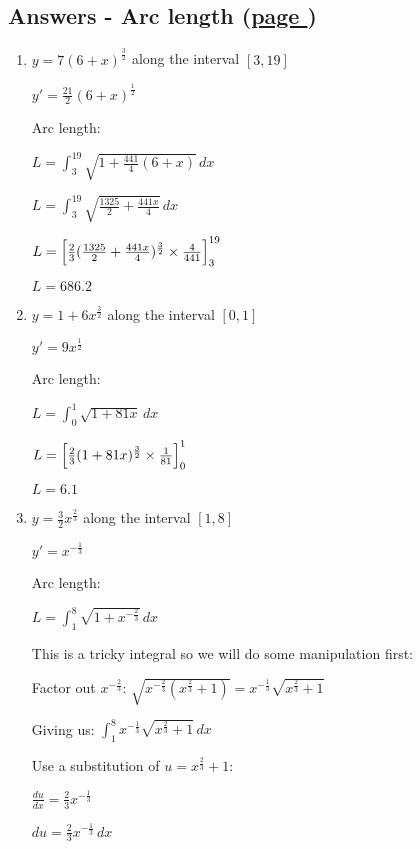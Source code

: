 \documentclass[../main.tex]{subfiles}
\begin{document}
\hypertarget{arclengthanswers}{\subsection*{Answers - Arc length (\hyperlink{arclengthlink}{page \pageref{Arc length}})}}

\label{Arc length answers}
\begin{enumerate}[itemsep=0.7cm]
    \item 
    $y=7(6+x)^{\frac{3}{2}}$ along the interval $[3,19]$

    $y'=\frac{21}{2}(6+x)^{\frac{1}{2}}$

    Arc length:

    $L=\int_3^{19} \sqrt{1+\frac{441}{4}(6+x)}\,dx$

    $L=\int_3^{19} \sqrt{\frac{1325}{2}+\frac{441x}{4}}\,dx$

    $L=\Bigl[\frac{2}{3}(\frac{1325}{2}+\frac{441x}{4})^{\frac{3}{2}}\times \frac{4}{441}\Bigr]_3^{19}$

    $L=686.2$

    \item
    $y=1+6x^{\frac{3}{2}}$ along the interval $[0,1]$

    $y'=9x^{\frac{1}{2}}$

    Arc length:

    $L=\int_0^1 \sqrt{1+81x}\,dx$

    $L=\Bigl[\frac{2}{3}(1+81x)^{\frac{3}{2}}\times \frac{1}{81}\Bigr]_0^1$

    $L=6.1$

    \item 
    $y=\frac{3}{2}x^{\frac{2}{3}}$ along the interval $[1,8]$

    $y'=x^{-\frac{1}{3}}$

    Arc length:

    $L=\int_1^8 \sqrt{1+x^{-\frac{2}{3}}}\,dx$

    This is a tricky integral so we will do some manipulation first:

    Factor out $x^{-\frac{2}{3}}$: $\sqrt{x^{-\frac{2}{3}}(x^{\frac{2}{3}}+1)}=x^{-\frac{1}{3}}\sqrt{x^{\frac{2}{3}}+1}$

    Giving us: $\int_1^8 x^{-\frac{1}{3}}\sqrt{x^{\frac{2}{3}}+1}\,dx$

    Use a substitution of $u=x^{\frac{2}{3}}+1$:

    $\frac{du}{dx}=\frac{2}{3}x^{-\frac{1}{3}}$

    $du=\frac{2}{3}x^{-\frac{1}{3}}\,dx$


\end{enumerate}
\end{document}
